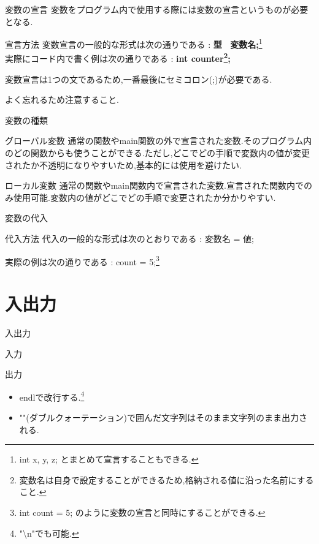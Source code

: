 \begin{frame}{変数の宣言}
    変数をプログラム内で使用する際には変数の宣言というものが必要となる.
    \begin{block}{宣言方法}
        変数宣言の一般的な形式は次の通りである : \textbf{型 \mbox{ }変数名;}\footnote{int x, y, z; とまとめて宣言することもできる.}
        \mbox{}\\
        
        実際にコード内で書く例は次の通りである : \textbf{int counter\footnote{変数名は自身で設定することができるため,格納される値に沿った名前にすること.};}
    \end{block}
    \begin{alertblock}{}
        変数宣言は1つの文であるため,一番最後にセミコロン(;)が必要である.
        
        よく忘れるため注意すること.
    \end{alertblock}
        
    
\end{frame}
\begin{frame}{変数の種類}
    \begin{block}{グローバル変数}
    通常の関数やmain関数の外で宣言された変数.そのプログラム内のどの関数からも使うことができる.ただし,どこでどの手順で変数内の値が変更されたか不透明になりやすいため,基本的には使用を避けたい.
    \end{block}
    \begin{block}{ローカル変数}
        通常の関数やmain関数内で宣言された変数.宣言された関数内でのみ使用可能.変数内の値がどこでどの手順で変更されたか分かりやすい.
    \end{block}
\end{frame}
\begin{frame}{変数の代入}
    \begin{block}{代入方法}
        代入の一般的な形式は次のとおりである : 変数名 = 値;
        
        実際の例は次の通りである : count = 5;\footnote{int count = 5; のように変数の宣言と同時にすることができる.}
    \end{block}
\end{frame}
\section{入出力} 
\label{in_out}
\begin{frame}[fragile]{入出力}
    \begin{block}{入力}
        
    \end{block}
    \begin{block}{出力}
        
        \begin{itemize}
            \item endlで改行する.\footnote{"\textbackslash n"でも可能.}
            \item ""(ダブルクォーテーション)で囲んだ文字列はそのまま文字列のまま出力される.
        \end{itemize}
    \end{block}
\end{frame}

